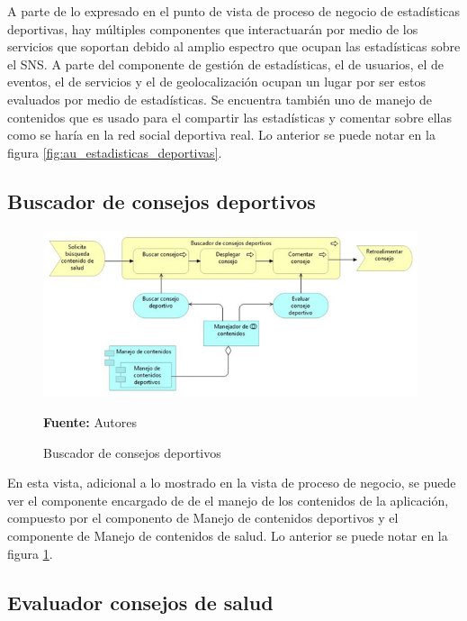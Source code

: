 A parte de lo expresado en el punto de vista de proceso de negocio de estadísticas deportivas, hay múltiples componentes que interactuarán por medio de los servicios que soportan debido al amplio espectro que ocupan las estadísticas sobre el SNS. A parte del componente de gestión de estadísticas, el de usuarios, el de eventos, el de servicios y el de geolocalización ocupan un lugar por ser estos evaluados por medio de estadísticas. Se encuentra también uno de manejo de contenidos que es usado para el compartir las estadísticas y comentar sobre ellas como se haría en la red social deportiva real. Lo anterior se puede notar en la figura \ref{fig:au_estadisticas_deportivas}.

\subsection{Buscador de consejos deportivos}

\begin{figure}[!htb]
  \begin{center}
    \includegraphics[width=11cm]{./imagenes/Archimate/vistas/application_usage/buscadorconsejosdeportivos.png}
    \caption{Buscador de consejos deportivos}
    \label{fig:BP_BuscadorConsejosDeportivos}
    \textbf{Fuente:}  Autores \\
  \end{center}
\end{figure}

En esta vista, adicional a lo mostrado en la vista de proceso de negocio, se puede ver el componente encargado de de el manejo de los contenidos de la aplicación, compuesto por el componento de Manejo de contenidos deportivos y el componente de Manejo de contenidos de salud. Lo anterior se puede notar en la figura \ref{fig:BP_BuscadorConsejosDeportivos}.

\subsection{Evaluador consejos de salud}

